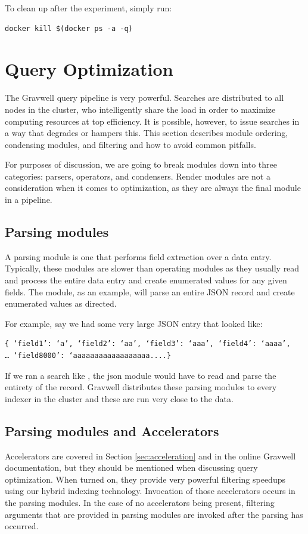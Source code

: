 To clean up after the experiment, simply run:

\begin{Verbatim}[breaklines=true]
docker kill $(docker ps -a -q)
\end{Verbatim}

\section{Query Optimization}
\label{sec:query-optimization}
The Gravwell query pipeline is very powerful. Searches are distributed
to all nodes in the cluster, who intelligently share the load in order to
maximize computing resources at top efficiency. It is possible, however,
to issue searches in a way that degrades or hampers this.
This section describes module ordering, condensing modules, and filtering
and how to avoid common pitfalls.

For purposes of discussion, we are going to break modules
down into three categories: parsers, operators, and condensers. Render
modules are not a consideration when it comes to optimization, as they
are always the final module in a pipeline.

\subsection{Parsing modules}
A parsing module is one that performs field extraction over a data
entry. Typically, these modules are slower than operating modules as
they usually read and process the entire data entry and create
enumerated values for any given fields. The  module, as an
example, will parse an entire JSON record and create enumerated values
as directed.

For example, say we had some very large JSON entry that looked like:

\begin{Verbatim}[breaklines=true]
{ ‘field1’: ‘a’, ‘field2’: ‘aa’, ‘field3’: ‘aaa’, ‘field4’: ‘aaaa’, 
… ‘field8000’: ‘aaaaaaaaaaaaaaaaaa....}
\end{Verbatim}

If we ran a search like , the json
module would have to read and parse the entirety of the record. Gravwell
distributes these parsing modules to every indexer in the cluster and
these are run very close to the data.

\subsection{Parsing modules and Accelerators}
Accelerators are covered in Section \ref{sec:acceleration} and in the online
Gravwell documentation, but they should be mentioned when discussing query optimization.
When turned on, they provide very powerful filtering speedups using our hybrid
indexing technology. Invocation of those accelerators occurs in the
parsing modules. In the case of no accelerators being present, filtering
arguments that are provided in parsing modules are invoked after the
parsing has occurred.

